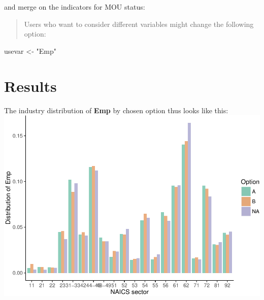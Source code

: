 \documentclass[]{article}
\newenvironment{Shaded}{\begin{snugshade}}{\end{snugshade}}
\newcommand{\KeywordTok}[1]{\textcolor[rgb]{0.13,0.29,0.53}{\textbf{{#1}}}}
\newcommand{\DataTypeTok}[1]{\textcolor[rgb]{0.13,0.29,0.53}{{#1}}}
\newcommand{\StringTok}[1]{\textcolor[rgb]{0.31,0.60,0.02}{{#1}}}
\newcommand{\OtherTok}[1]{\textcolor[rgb]{0.56,0.35,0.01}{{#1}}}
\newcommand{\NormalTok}[1]{{#1}}
\begin{document}
and merge on the indicators for MOU status:

\begin{Shaded}
\end{Shaded}

\begin{quote}
Users who want to consider different variables might change the
following option:
\end{quote}

\begin{Shaded}
\begin{Highlighting}[]
\NormalTok{usevar <-}\StringTok{ "Emp"}
\end{Highlighting}
\end{Shaded}

\section{Results}\label{results}

The industry distribution of \textbf{Emp} by chosen option thus looks
like this:
\includegraphics{s2014_availability_files/figure-latex/graph_Emp-1.pdf}
\end{document}
